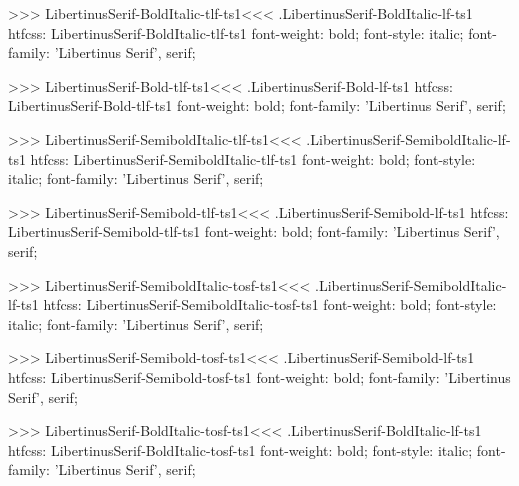 {{{{>>>
\<LibertinusSerif-BoldItalic-tlf-ts1\><<<
.LibertinusSerif-BoldItalic-lf-ts1
htfcss:  LibertinusSerif-BoldItalic-tlf-ts1  font-weight: bold; font-style: italic; font-family: 'Libertinus Serif', serif;

>>>
\<LibertinusSerif-Bold-tlf-ts1\><<<
.LibertinusSerif-Bold-lf-ts1
htfcss:  LibertinusSerif-Bold-tlf-ts1  font-weight: bold; font-family: 'Libertinus Serif', serif;

>>>
\<LibertinusSerif-SemiboldItalic-tlf-ts1\><<<
.LibertinusSerif-SemiboldItalic-lf-ts1
htfcss:  LibertinusSerif-SemiboldItalic-tlf-ts1  font-weight: bold; font-style: italic; font-family: 'Libertinus Serif', serif;

>>>
\<LibertinusSerif-Semibold-tlf-ts1\><<<
.LibertinusSerif-Semibold-lf-ts1
htfcss:  LibertinusSerif-Semibold-tlf-ts1  font-weight: bold; font-family: 'Libertinus Serif', serif;

>>>
\<LibertinusSerif-SemiboldItalic-tosf-ts1\><<<
.LibertinusSerif-SemiboldItalic-lf-ts1
htfcss:  LibertinusSerif-SemiboldItalic-tosf-ts1  font-weight: bold; font-style: italic; font-family: 'Libertinus Serif', serif;

>>>
\<LibertinusSerif-Semibold-tosf-ts1\><<<
.LibertinusSerif-Semibold-lf-ts1
htfcss:  LibertinusSerif-Semibold-tosf-ts1  font-weight: bold; font-family: 'Libertinus Serif', serif;

>>>
\<LibertinusSerif-BoldItalic-tosf-ts1\><<<
.LibertinusSerif-BoldItalic-lf-ts1
htfcss:  LibertinusSerif-BoldItalic-tosf-ts1  font-weight: bold; font-style: italic; font-family: 'Libertinus Serif', serif;

}}}}
